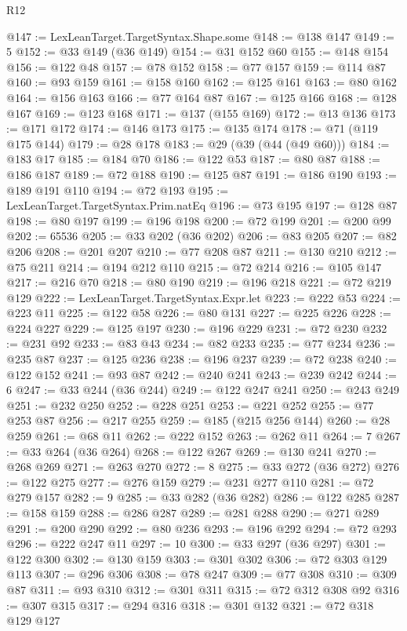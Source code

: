 \begin{lexlean}{R12}
\begin{coremodule}
@147 := LexLeanTarget.TargetSyntax.Shape.some
@148 := @138 @147
@149 := 5
@152 := @33 @149 (@36 @149)
@154 := @31 @152 @60
@155 := @148 @154
@156 := @122 @48
@157 := @78 @152
@158 := @77 @157
@159 := @114 @87
@160 := @93 @159
@161 := @158 @160
@162 := @125 @161
@163 := @80 @162
@164 := @156 @163
@166 := @77 @164 @87
@167 := @125 @166
@168 := @128 @167
@169 := @123 @168
@171 := @137 (@155 @169)
@172 := @13 @136
@173 := @171 @172
@174 := @146 @173
@175 := @135 @174
@178 := @71 (@119 @175 @144)
@179 := @28 @178
@183 := @29 (@39 (@44 (@49 @60)))
@184 := @183 @17
@185 := @184 @70
@186 := @122 @53
@187 := @80 @87
@188 := @186 @187
@189 := @72 @188
@190 := @125 @87
@191 := @186 @190
@193 := @189 @191 @110
@194 := @72 @193
@195 := LexLeanTarget.TargetSyntax.Prim.natEq
@196 := @73 @195
@197 := @128 @87
@198 := @80 @197
@199 := @196 @198
@200 := @72 @199
@201 := @200 @99
@202 := 65536
@205 := @33 @202 (@36 @202)
@206 := @83 @205
@207 := @82 @206
@208 := @201 @207
@210 := @77 @208 @87
@211 := @130 @210
@212 := @75 @211
@214 := @194 @212 @110
@215 := @72 @214
@216 := @105 @147
@217 := @216 @70
@218 := @80 @190
@219 := @196 @218
@221 := @72 @219 @129
@222 := LexLeanTarget.TargetSyntax.Expr.let
@223 := @222 @53
@224 := @223 @11
@225 := @122 @58
@226 := @80 @131
@227 := @225 @226
@228 := @224 @227
@229 := @125 @197
@230 := @196 @229
@231 := @72 @230
@232 := @231 @92
@233 := @83 @43
@234 := @82 @233
@235 := @77 @234
@236 := @235 @87
@237 := @125 @236
@238 := @196 @237
@239 := @72 @238
@240 := @122 @152
@241 := @93 @87
@242 := @240 @241
@243 := @239 @242
@244 := 6
@247 := @33 @244 (@36 @244)
@249 := @122 @247 @241
@250 := @243 @249
@251 := @232 @250
@252 := @228 @251
@253 := @221 @252
@255 := @77 @253 @87
@256 := @217 @255
@259 := @185 (@215 @256 @144)
@260 := @28 @259
@261 := @68 @11
@262 := @222 @152
@263 := @262 @11
@264 := 7
@267 := @33 @264 (@36 @264)
@268 := @122 @267
@269 := @130 @241
@270 := @268 @269
@271 := @263 @270
@272 := 8
@275 := @33 @272 (@36 @272)
@276 := @122 @275
@277 := @276 @159
@279 := @231 @277 @110
@281 := @72 @279 @157
@282 := 9
@285 := @33 @282 (@36 @282)
@286 := @122 @285
@287 := @158 @159
@288 := @286 @287
@289 := @281 @288
@290 := @271 @289
@291 := @200 @290
@292 := @80 @236
@293 := @196 @292
@294 := @72 @293
@296 := @222 @247 @11
@297 := 10
@300 := @33 @297 (@36 @297)
@301 := @122 @300
@302 := @130 @159
@303 := @301 @302
@306 := @72 @303 @129 @113
@307 := @296 @306
@308 := @78 @247
@309 := @77 @308
@310 := @309 @87
@311 := @93 @310
@312 := @301 @311
@315 := @72 @312 @308 @92
@316 := @307 @315
@317 := @294 @316
@318 := @301 @132
@321 := @72 @318 @129 @127

\end{coremodule}
\end{lexlean}
